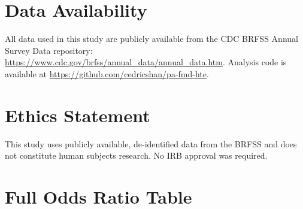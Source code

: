 \documentclass[11pt]{article}
\begin{document}
\section*{Data Availability}
All data used in this study are publicly available from the CDC BRFSS Annual Survey Data repository: \url{https://www.cdc.gov/brfss/annual_data/annual_data.htm}.
Analysis code is available at \url{https://github.com/cedricshan/pa-fmd-hte}.

\section*{Ethics Statement}
This study uses publicly available, de-identified data from the BRFSS and does not constitute human subjects research. No IRB approval was required.



\clearpage
\appendix
\section{Full Odds Ratio Table}
\label{app:or}
\end{document}
